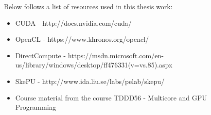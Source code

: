 \documentclass{article}
\begin{document}
Below follows a list of resources used in this thesis work:

\begin{itemize}
    \item CUDA - http://docs.nvidia.com/cuda/
    \item OpenCL - https://www.khronos.org/opencl/
    \item DirectCompute - https://msdn.microsoft.com/en-us/library/windows/desktop/ff476331(v=vs.85).aspx
    \item SkePU - http://www.ida.liu.se/labs/pelab/skepu/
    \item Course material from the course TDDD56 - Multicore and GPU Programming 
\end{itemize}


\nocite{*}


\end{document}
